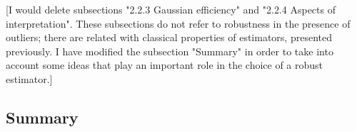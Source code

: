 
\alert{[I would delete subsections "2.2.3 Gaussian efficiency" and "2.2.4
Aspects of interpretation". These subsections do not refer to robustness in the
presence of outliers; there are related with classical properties of
estimators, presented previously. I have modified the subsection "Summary" in
order to take into account some ideas that play an important role in the choice
of a robust estimator.]}







\subsection{Summary}

